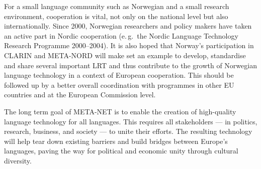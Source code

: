 \begin{multicols}{2}
For a small language community such as Norwegian and a small research environment, cooperation is vital, not only on the national level but also internationally. Since 2000, Norwegian researchers and policy makers have taken an active part in Nordic cooperation (e.\,g.~the Nordic Language Technology Research Programme 2000–2004). It is also hoped that Norway’s participation in CLARIN and META-NORD will make set an example to develop, standardise and share several important LRT and thus contribute to the growth of Norwegian language technology in a context of European cooperation. This should be followed up by a better overall coordination with programmes in other EU countries and at the European Commission level.



The long term goal of META-NET is to enable the creation of high-quality language technology for all languages. This requires all stakeholders --- in politics, research, business, and society --- to unite their efforts. The resulting technology will help tear down existing barriers and build bridges between Europe’s languages, paving the way for political and economic unity through cultural diversity. 

\end{multicols}

\clearpage

